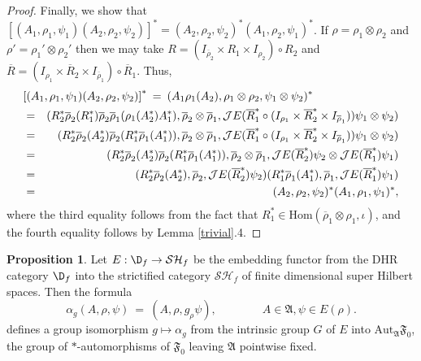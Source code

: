 \documentclass[12pt]{article}
\newcommand{\alg}[1]{\mathfrak{#1}}
\theoremstyle{definition}
\newtheorem{prop}[thm]{Proposition}
\theoremstyle{definition}
\theoremstyle{remark}
\def\2#1{{\mathcal #1}}
\def\ol#1{{\overline #1}}
\def\a{\alpha} \def\b{\beta} \def\g{\gamma} \def\d{\delta}
\newcommand{\Hom}{\mathrm{Hom}}
\newcommand{\Aut}{\mathrm{Aut}}
\begin{document}
\begin{proof}
Finally, we show that $[(A_1,\rho _1,\psi _1)(A_2,\rho _2,\psi _2)]^*=(A_2,\rho
_2,\psi _2)^*(A_1,\rho _2,\psi _1)^*$.  If $\rho =\rho _1\otimes \rho _2$ and $\rho
'=\rho _1'\otimes \rho _2'$ then we may take $R=(I_{\ol\rho _2}\times R_1\times
I_{\rho _2})\circ R_2$ and $\ol R=(I_{\rho _1}\times \ol R_2\times I_{\ol\rho
  _1})\circ \ol R_1$.  Thus,
\begin{eqnarray*}
  \lefteqn{ \left[ (A_1,\rho _1,\psi _1)(A_2,\rho _2,\psi _2)\right] ^*  \: =\: (A_1\rho
    _1(A_2),\rho _1\otimes \rho _2,\psi _1\otimes \psi  _2)^* } \\
  &=& (R_2^*\ol\rho _2(R_1^*)\ol\rho _2\ol\rho _1(\rho
  _1(A_2^*)A_1^*),\ol\rho _2\otimes \ol\rho _1,\2JE(\ol
  R_1^*\circ (I_{\rho _1}\times \ol R_2^*\times I_{\ol\rho _1}))\psi _1\otimes \psi
  _2 ) \\
  &=& (R_2^*\ol\rho _2(A_2^*)\ol\rho _2(R_1^*\ol\rho _1(A_1^*)),\ol\rho _2\otimes
  \ol\rho _1,\2JE(\ol R_1^*\circ
  (I_{\rho _1}\times \ol R_2^*\times I_{\ol\rho _1}))\psi _1\otimes \psi _2) \\
  &=& (R_2^*\ol\rho _2(A_2^*)\ol\rho _2(R_1^*\ol\rho _1(A_1^*)),\ol\rho _2\otimes \ol\rho_1,\2JE(\ol R_2^*)\psi
  _2\otimes \2JE(\ol R_1^*)\psi _1) \\
  &=& (R_2^*\ol\rho _2(A_2^*),\ol\rho _2 ,\2JE(\ol R_2^*)\psi _2)(R_1^*\ol \rho
  _1(A_1^*), \ol\rho _1,\2JE(\ol
  R_1^*)\psi _1) \\
  &=& (A_2,\rho _2,\psi _2)^*(A_1,\rho _1,\psi _1)^* ,\end{eqnarray*}
where the third equality follows from the fact that $R_1^*\in \Hom (\ol\rho _1\otimes
\rho _1,\iota )$, and the fourth equality follows by Lemma \ref{trivial}.4. 
\end{proof}


\begin{prop} Let $E:\D _f\to \2S\2H_f$ be the embedding functor from the DHR
  category $\D _f$ into the strictified category $\2S\2H_f$ of finite dimensional
  super Hilbert spaces.  Then the formula 
  \begin{equation} \a _g(A,\rho ,\psi )\: =\: (A,\rho
    ,g_\rho \psi ),\qquad \qquad A\in \alg{A},\psi \in
    E(\rho ). \label{automorphism} \end{equation}
  defines a group isomorphism $g\mapsto \a _g$ from the
  intrinsic group $G$ of $E$ into $\Aut
  _{\alg{A}}\alg{F}_0$, the group of $*$-automorphisms
  of $\alg{F}_0$ leaving $\alg{A}$ pointwise
  fixed.  \label{group-isomorphism} \end{prop}
\end{document}
